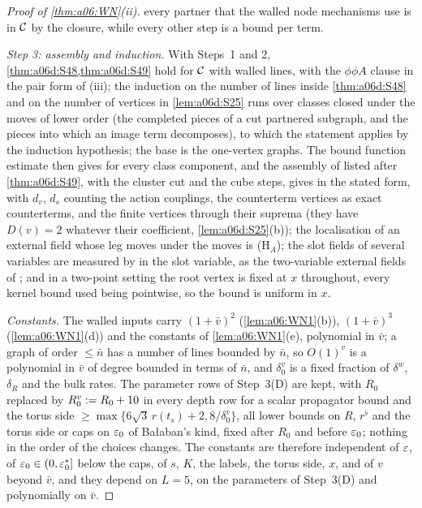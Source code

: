 \begin{proof}[Proof of \cref{thm:a06:WN}\textup{(ii)}]
every partner that the walled node mechanisms use is in $\mathcal C$ by the closure, while every other step is a bound per term.

\emph{Step 3: assembly and induction.} With Steps~1 and 2, \cref{thm:a06d:S48,thm:a06d:S49} hold for $\mathcal C$ with walled lines, with the $\phi\phi A$ clause in the pair form of (iii); the induction on the number of lines inside \cref{thm:a06d:S48} and on the number of vertices in \cref{lem:a06d:S25} runs over classes closed under the moves of lower order (the completed pieces of a cut partnered subgraph, and the pieces into which an image term decomposes), to which the statement applies by the induction hypothesis; the base is the one-vertex graphs. The bound function estimate \cite[(2.16)]{Ba3} then gives \cite[(3.3)]{Ba3} for every class component, and the assembly of \cite[pp.~420--445]{Ba3} listed after \cref{thm:a06d:S49}, with the cluster cut and the cube steps, gives \cite[(1.33)]{Ba3} in the stated form, with $d_v$, $d_s$ counting the action couplings, the counterterm vertices as exact counterterms, and the finite vertices through their suprema (they have $D(v)=2$ whatever their coefficient, \cref{lem:a06d:S25}(b)); the localisation of an external field whose leg moves under the moves is (H$_A$); the slot fields of several variables are measured by \cite[(1.32)]{Ba3} in the slot variable, as the two-variable external fields of \cite[p.~419]{Ba3}; and in a two-point setting the root vertex is fixed at $x$ throughout, every kernel bound used being pointwise, so the bound is uniform in $x$.

\emph{Constants.} The walled inputs carry $(1+\bar v)^2$ (\cref{lem:a06:WN1}(b)), $(1+\bar v)^3$ (\cref{lem:a06:WN1}(d)) and the constants of \cref{lem:a06:WN1}(e), polynomial in $\bar v$; a graph of order $\le\bar n$ has a number of lines bounded by $\bar n$, so $O(1)^v$ is a polynomial in $\bar v$ of degree bounded in terms of $\bar n$, and $\delta^v_0$ is a fixed fraction of $\delta^w$, $\delta_R$ and the bulk rates. The parameter rows of Step~3(D) are kept, with $R_0$ replaced by $R^v_0:= R_0+10$ in every depth row for a scalar propagator bound and the torus side $\ge\max\{6\sqrt3\,r(t_s)+2,8/\delta^v_0\}$, all lower bounds on $R$, $r^\flat$ and the torus side or caps on $\varepsilon_0$ of Ba{\l}aban's kind, fixed after $R_0$ and before $\varepsilon_0$; nothing in the order of the choices changes. The constants are therefore independent of $\varepsilon$, of $\varepsilon_0\in(0,\varepsilon^*_0]$ below the caps, of $s$, $K$, the labels, the torus side, $x$, and of $v$ beyond $\bar v$, and they depend on $L=5$, on the parameters of Step~3(D) and polynomially on $\bar v$.
\end{proof}

